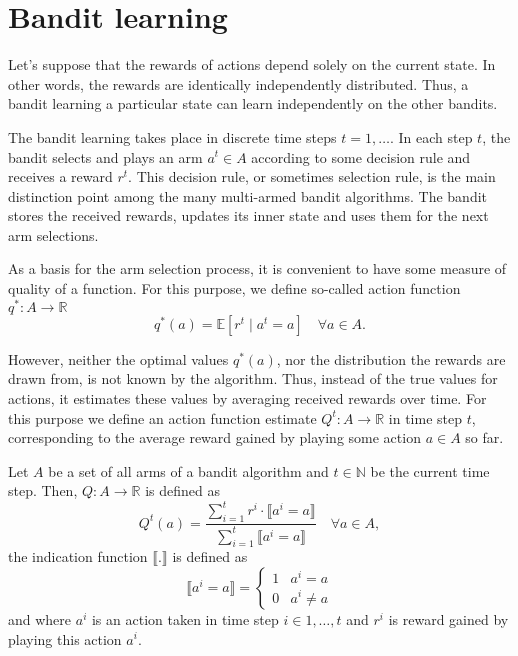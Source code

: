 \documentclass[../main.tex]{subfiles}
\begin{document}
\section{Bandit learning}\label{bandit:learn}
Let's suppose that the rewards of actions depend solely on the current state.
In other words, the rewards are identically independently distributed.
Thus, a bandit learning a particular state can learn independently on the other bandits.

The bandit learning takes place in discrete time steps $t = 1, \dots$.
In each step $t$, the bandit selects and plays an arm $a^t \in A$ according to some decision rule and receives a reward $r^t$.
This decision rule, or sometimes selection rule, is the main distinction point among the many multi-armed bandit algorithms.
The bandit stores the received rewards, updates its inner state and uses them for the next arm selections.

As a basis for the arm selection process, it is convenient to have some measure of quality of a function.
For this purpose, we define so-called action function $q^*: A \to \mathbb{R}$
\begin{equation}\label{bandit:learn:opt}
    q^*(a) = \mathbb{E}[r^t \mid a^t = a] \quad \forall a \in A.
\end{equation}

However, neither the optimal values $q^*(a)$, nor the distribution the rewards are drawn from, is not known by the algorithm.
Thus, instead of the true values for actions, it estimates these values by averaging received rewards over time.
For this purpose we define an action function estimate $Q^t: A \to \mathbb{R}$ in time step $t$, corresponding to the average reward gained by playing some action $a \in A$ so far.
\begin{definition}\label{bandit:learn:afunc}
    Let $A$ be a set of all arms of a bandit algorithm and $t \in \mathbb{N}$ be the current time step. Then, $Q: A \to \mathbb{R}$ is defined as
    \begin{equation}
        Q^t(a) = \frac{\sum_{i = 1}^{t}r^i\cdot\llbracket a^i = a \rrbracket}{\sum_{i = 1}^{t}\llbracket a^i = a \rrbracket} \quad \forall a \in A, 
    \end{equation}
    the indication function $\llbracket.\rrbracket$ is defined as
    \begin{equation}
        \llbracket a^i = a \rrbracket = \begin{cases}
            1 & a^i = a \\
            0 & a^i \neq a
        \end{cases}
    \end{equation}
    and where $a^i$ is an action taken in time step $i \in {1, \dots, t}$ and $r^i$ is reward gained by playing this action $a^i$.
\end{definition}
\end{document}
